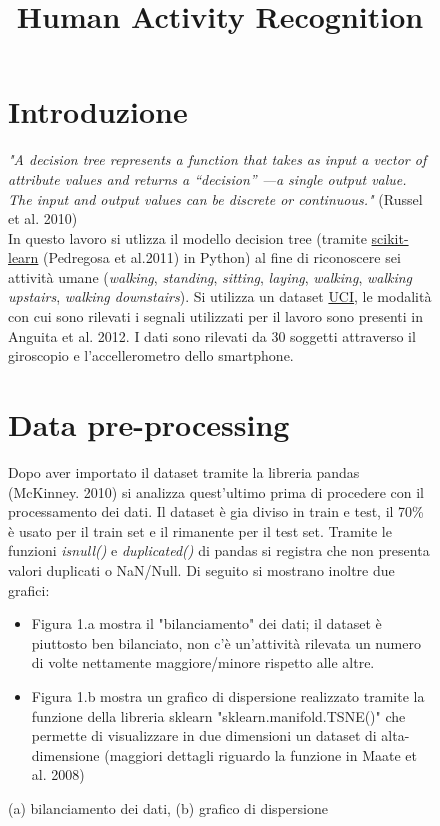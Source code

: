 \documentclass[]{article}
\title{Human Activity Recognition}
\date{}
\begin{document}
\begin{figure}
\maketitle
\section{Introduzione}
\textit{"A decision tree represents a function that takes as input a vector of attribute values and returns a “decision” —a single output value. The input and output values can be discrete or continuous."}  (Russel et al. 2010) \\
In questo lavoro si utlizza il modello decision tree (tramite \href{https://scikit-learn.org/stable/}{scikit-learn} (Pedregosa et al.2011) in Python) al fine di riconoscere sei attività umane (\textit{walking}, \textit{standing}, \textit{sitting}, \textit{laying}, \textit{walking}, \textit{walking upstairs}, \textit{walking downstairs}). Si utilizza un dataset \href{http://archive.ics.uci.edu/ml/datasets/Human+Activity+Recognition+Using+Smartphones}{UCI}, le modalità con cui sono rilevati i segnali utilizzati per il lavoro sono presenti in Anguita et al. 2012. I dati sono rilevati da 30 soggetti attraverso il giroscopio e l'accellerometro dello smartphone. 


\section{Data pre-processing}
Dopo aver importato il dataset tramite la libreria pandas (McKinney. 2010) si analizza quest'ultimo prima di procedere con il processamento dei dati. Il dataset è gia diviso in train e test, il 70\% è usato per il train set e il rimanente per il test set.
Tramite le funzioni \textit{isnull()} e \textit{duplicated()} di pandas si registra che non presenta valori duplicati o NaN/Null.
Di seguito si mostrano inoltre due grafici:
\begin{itemize}
\item Figura 1.a mostra il "bilanciamento" dei dati; il dataset è piuttosto ben bilanciato, non c'è un'attività rilevata un numero di volte nettamente maggiore/minore rispetto alle altre.
\item Figura 1.b mostra un grafico di dispersione realizzato tramite la funzione della libreria sklearn "sklearn.manifold.TSNE()" che permette di visualizzare in due dimensioni un dataset di alta-dimensione (maggiori dettagli riguardo la funzione in Maate et al. 2008)
\end{itemize}
\hspace*{\fill}
\caption{(a) bilanciamento dei dati, (b) grafico di dispersione} 
\medskip




\end{figure}
\end{document}
